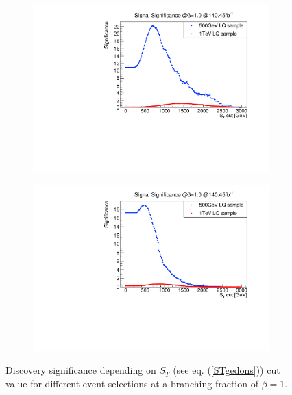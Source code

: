 \begin{figure}
\begin{subfigure}[t]{0.49\textwidth}
                \end{subfigure}
                \begin{subfigure}[t]{0.49\textwidth}
                \includegraphics[width=\textwidth]{figures/plots/Significance/xcut_1b-jet_1tau.pdf}
                \label{xcut:ST:1b1tau}
                \end{subfigure}
                \begin{subfigure}[t]{0.49\textwidth}
                \includegraphics[width=\textwidth]{figures/plots/Significance/xcut_1b-jet_2tau.pdf}
                \label{xcut:ST:1b2tau}
                \end{subfigure}
\caption[Discovery significance depending on the $S_T$ cut value.]{Discovery significance depending on $S_T$ (see eq. (\ref{STgedöns})) cut value for different event selections at a branching fraction of $\beta=1$.}
\label{xcut:ST}
\end{figure}

